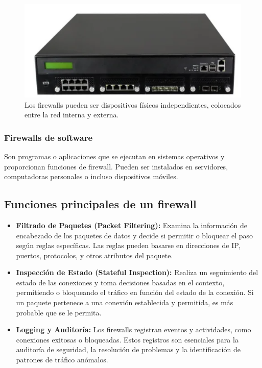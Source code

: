  \begin{figure}[H]
 	\centering
 	\includegraphics[width=0.4\linewidth]{Imagenes/firewall.png}
 	\caption{ Los firewalls pueden ser dispositivos físicos independientes, colocados entre la red interna y externa. }
 	\label{fig:enter-label}
 \end{figure}
 \subsubsection{Firewalls de software}
  Son programas o aplicaciones que se ejecutan en sistemas operativos y proporcionan funciones de firewall. Pueden ser instalados en servidores, computadoras personales o incluso dispositivos móviles.
  
  \subsection{Funciones principales de un firewall}
  \begin{tcolorbox}[title= Funcionamiento básico de un firewall]
  	\begin{itemize}
  		
  		
  		\item \textbf{Filtrado de Paquetes (Packet Filtering):}
  		Examina la información de encabezado de los paquetes de datos y decide si permitir o bloquear el paso según reglas específicas. Las reglas pueden basarse en direcciones de IP, puertos, protocolos, y otros atributos del paquete.
  		\item \textbf{Inspección de Estado (Stateful Inspection):}
  		Realiza un seguimiento del estado de las conexiones y toma decisiones basadas en el contexto, permitiendo o bloqueando el tráfico en función del estado de la conexión. Si un paquete pertenece a una conexión establecida y permitida, es más probable que se le permita.
  		\item \textbf{Logging y Auditoría:}
  		Los firewalls registran eventos y actividades, como conexiones exitosas o bloqueadas. Estos registros son esenciales para la auditoría de seguridad, la resolución de problemas y la identificación de patrones de tráfico anómalos.
  		
  		
  	\end{itemize}
  \end{tcolorbox}